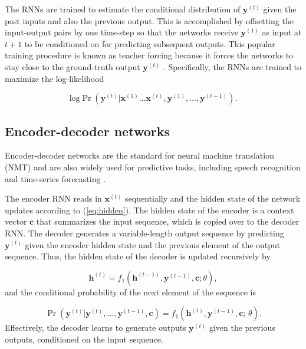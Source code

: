 \documentclass[hidelinks,12pt]{article}
\begin{document}
The RNNs are trained to estimate the conditional distribution of $\boldsymbol{y}^{(t)}$ given the past inputs and also the previous output. This is accomplished by offsetting the input-output pairs by one time-step so that the networks receive $\boldsymbol{y}^{(1)}$  as input at $t + 1$ to be conditioned on for predicting subsequent outputs. This popular training procedure is known as teacher forcing because it forces the networks to stay close to the ground-truth output $\boldsymbol{y}^{(t)}$ \citep{lamb2016professor}. Specifically, the RNNs are trained to maximize the log-likelihood

\begin{equation} \label{rnn-obj}
\text{log} \Pr \left(\boldsymbol{y}^{(t)} | \boldsymbol{x}^{(1)} \ldots \boldsymbol{x}^{(t)},\boldsymbol{y}^{(1)}, \ldots, \boldsymbol{y}^{(t-1)} \right).
\end{equation}

\subsection{Encoder-decoder networks}

Encoder-decoder networks are the standard for neural machine translation (NMT) \citep{cho2014learning,bahdanau2014neural,vinyals2014grammar} and are also widely used for predictive tasks, including speech recognition \citep{chorowski2015attention} and time-series forecasting \citep{zhu2017deep}. 

The encoder RNN reads in $\boldsymbol{x}^{(t)}$ sequentially and the hidden state of the network updates according to (\ref{eq:hidden}). The hidden state of the encoder is a context vector $\boldsymbol{c}$ that summarizes the input sequence, which is copied over to the decoder RNN. The decoder generates a variable-length output sequence by predicting $\boldsymbol{y}^{(t)}$ given the encoder hidden state and the previous element of the output sequence. Thus, the hidden state of the decoder is updated recursively by

\begin{equation}
\boldsymbol{h}^{(t)} = f_1 \left( \boldsymbol{h}^{(t-1)}, \boldsymbol{y}^{(t-1)}, \boldsymbol{c}; \theta \right), \label{eq:decoder}
\end{equation} and the conditional probability of the next element of the sequence is 

\begin{equation}
\Pr (\boldsymbol{y}^{(t)} | \boldsymbol{y}^{(t)}, \ldots, \boldsymbol{y}^{(t-1)}, \boldsymbol{c}) =  f_1 \left( \boldsymbol{h}^{(t)}, \boldsymbol{y}^{(t-1)}, \boldsymbol{c}; \, \theta \right).
\end{equation}  Effectively, the decoder learns to generate outputs $\boldsymbol{y}^{(t)}$ given the previous outputs, conditioned on the input sequence. 
\end{document}
